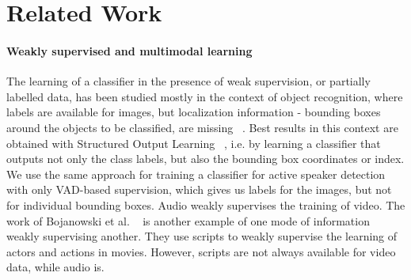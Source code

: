 \documentclass[runningheads]{llncs}
\begin{document}
\section{Related Work}
\label{relWork}

\paragraph{Weakly supervised and multimodal learning} 
The learning of a classifier in the presence of weak supervision, or partially labelled data, has been studied mostly in the context of object recognition, where labels are available for images, but localization information - bounding boxes around the objects to be classified, are missing ~\cite{Bilen14a,Bilen14,Bilen15,Deselaers12,Song14}. 
Best results in this context are obtained with Structured Output Learning ~\cite{Nguyen09}, i.e. by learning a classifier that outputs not only the class labels, but also the bounding box coordinates or index.%
We use the same approach for training a classifier for active speaker detection with only VAD-based supervision, which gives us labels for the images, but not for individual bounding boxes. Audio weakly supervises the training of video.
The work of Bojanowski et al. ~\cite{Bojanowski13} is another example of one mode of information weakly supervising another. They use scripts to weakly supervise the learning of actors and actions in movies. 
However, scripts are not always available for video data, while audio is.
\end{document}
